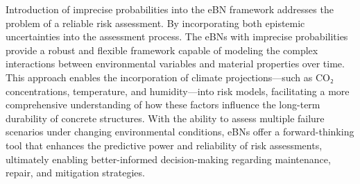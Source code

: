 Introduction of imprecise probabilities into the eBN framework addresses the problem of a reliable risk assessment. By incorporating both epistemic uncertainties into the assessment process. The eBNs with imprecise probabilities provide a robust and flexible framework capable of modeling the complex interactions between environmental variables and material properties over time. This approach enables the incorporation of climate projections—such as CO₂ concentrations, temperature, and humidity—into risk models, facilitating a more comprehensive understanding of how these factors influence the long-term durability of concrete structures. With the ability to assess multiple failure scenarios under changing environmental conditions, eBNs offer a forward-thinking tool that enhances the predictive power and reliability of risk assessments, ultimately enabling better-informed decision-making regarding maintenance, repair, and mitigation strategies.